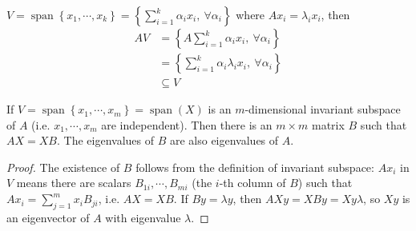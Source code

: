 \documentclass[11pt]{article}
\numberwithin{equation}{section}
\begin{document}
\begin{example}
    $V = \operatorname{span}\left\{ x_1, \cdots, x_k \right\} = \left\{ \sum_{i=1}^{k} \alpha_i x_i, \ \forall \alpha_i \right\}$
    where $A x_{i}=\lambda_{i} x_{i}$, then \begin{align*}
        AV &= \left\{A \sum_{i=1}^{k} \alpha_i x_i, \ \forall \alpha_i \right\} \\
        &= \left\{ \sum_{i=1}^{k} \alpha_i \lambda_i x_i, \ \forall \alpha_i \right\} \\
        &\subseteq V
    \end{align*} 
\end{example}

\begin{lemma}
    If $V = \operatorname{span}\left\{ x_1, \cdots, x_m \right\} = \operatorname{span}(X)$ is an $m$-dimensional invariant subspace of $A$ (i.e. $x_1, \cdots, x_m$ are independent).
    Then  there is an $m\times m$ matrix $B$ such that $AX = XB$. The eigenvalues of $B$ are also eigenvalues of $A$.
    \begin{proof}
        The existence of $B$ follows from the definition of invariant subspace:
        $Ax_i$ in $V$ means there are scalars $B_{1i},\cdots,B_{mi}$ (the $i$-th column of $B$) such that
        $Ax_i = \sum_{j=1}^{m} x_{i}B_{ji}$, i.e. $AX=XB$. If $By = \lambda y$, then
        $AXy = XBy = Xy \lambda$, so $Xy$ is an eigenvector of $A$ with eigenvalue $\lambda$.
    \end{proof}
\end{lemma}
\end{document}

